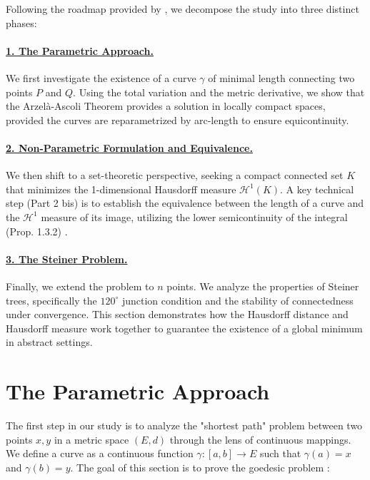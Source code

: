 \documentclass[12pt]{article}
\begin{document}
Following the roadmap provided by \cite{ambrosio2004topics}, we decompose the study into three distinct phases:     

\paragraph{\hyperref[sec:param]{1. The Parametric Approach.}}
We first investigate the existence of a curve $\gamma$ of minimal length connecting two points $P$ and $Q$. Using the total variation and the metric derivative, we show that the Arzelà-Ascoli Theorem provides a solution in locally compact spaces, provided the curves are reparametrized by arc-length to ensure equicontinuity.

\paragraph{\hyperref[sec:nonparam]{2. Non-Parametric Formulation and Equivalence.}}
We then shift to a set-theoretic perspective, seeking a compact connected set $K$ that minimizes the 1-dimensional Hausdorff measure $\mathcal{H}^1(K)$. A key technical step (Part 2 bis) is to establish the equivalence between the length of a curve and the $\mathcal{H}^1$ measure of its image, utilizing the lower semicontinuity of the integral (Prop. 1.3.2) \cite{ambrosio2004topics}.
\paragraph{\hyperref[sec:steiner]{3. The Steiner Problem.}}
Finally, we extend the problem to $n$ points. We analyze the properties of Steiner trees, specifically the $120^\circ$ junction condition and the stability of connectedness under convergence. This section demonstrates how the Hausdorff distance and Hausdorff measure work together to guarantee the existence of a global minimum in abstract settings.


\section{The Parametric Approach} \label{sec:param}

The first step in our study is to analyze the "shortest path" problem between two points $x, y$ in a metric space $(E, d)$ through the lens of continuous mappings. We define a curve as a continuous function $\gamma: [a, b] \to E$ such that $\gamma(a) = x$ and $\gamma(b) = y$. The goal of this section is to prove the goedesic problem : 
\end{document}
